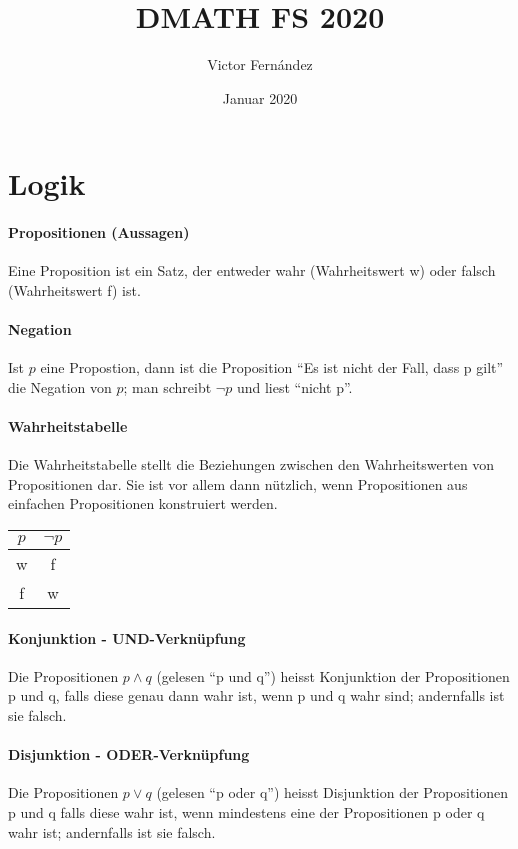\documentclass[10pt,a4paper]{article}
\title{DMATH FS 2020}
\author{Victor Fernández}
\date{Januar 2020}
\begin{document}
\maketitle
\tableofcontents
\thispagestyle{empty}
\pagebreak

\section{Logik}
\paragraph{Propositionen (Aussagen)}Eine Proposition ist ein Satz, der entweder wahr (Wahrheitswert w) oder falsch (Wahrheitswert f) ist.
\paragraph{Negation}Ist $p$ eine Propostion, dann ist die Proposition "`Es ist nicht der Fall, dass p gilt"' die Negation von $p$; man schreibt $\neg p$ und liest "`nicht p"'.
\paragraph{Wahrheitstabelle}Die Wahrheitstabelle stellt die Beziehungen zwischen den Wahrheitswerten von Propositionen dar. Sie ist vor allem dann nützlich, wenn Propositionen aus einfachen Propositionen konstruiert werden.\\
\begin{tabular}{|c|c|}
    \hline
        $p$&$\neg p$\\
        \hline
        w&f\\
        f&w\\
    \hline
\end{tabular}
\paragraph{Konjunktion - UND-Verknüpfung}Die Propositionen $p\wedge q$ (gelesen "`p und q"') heisst Konjunktion der Propositionen p und q, falls diese genau dann wahr ist, wenn p und q wahr sind; andernfalls ist sie falsch.
\paragraph{Disjunktion - ODER-Verknüpfung}Die Propositionen $p\vee q$ (gelesen "`p oder q"') heisst Disjunktion der Propositionen p und q falls diese wahr ist, wenn mindestens eine der Propositionen p oder q wahr ist; andernfalls ist sie falsch.
\end{document}
